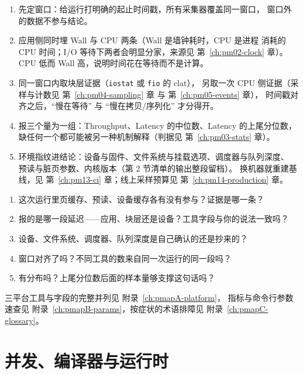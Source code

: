 \documentclass[12pt,a4paper,fontset=fandol]{ctexbook}
\newcommand{\Tp}[1]{\texttt{#1}}
\newcommand{\Lang}[1]{\textsf{#1}}
\newcommand{\MWall}{\Lang{Wall}}
\newcommand{\MCpu}{\Lang{CPU}}
\newcommand{\MLat}{\Lang{Latency}}
\newcommand{\MThr}{\Lang{Throughput}}
\newcommand{\Mx}[1]{\textsf{#1}}
\begin{document}
\begin{bestpractice}[title={把 I/O 的账与 CPU 的账分开测，但在同一次运行里对齐}]
\begin{enumerate}
\item 先定窗口：给运行打明确的起止时间戳，所有采集器覆盖同一窗口，
  窗口外的数据不参与结论。
\item 应用侧同时埋 \MWall{} 与 \MCpu{} 两条（\MWall{} 是墙钟耗时，\MCpu{} 是进程
  消耗的 CPU 时间；I/O 等待下两者会明显分家，来源见 第~\ref{ch:pm02-clock} 章）。
  \MCpu{} 低而 \MWall{} 高，说明时间花在等待而不是计算。
\item 同一窗口内取块层证据（\Tp{iostat} 或 \Tp{fio} 的 \Mx{clat}），
  另取一次 CPU 侧证据（采样与计数见 第~\ref{ch:pm04-sampling} 章 与 第~\ref{ch:pm05-events} 章），
  时间戳对齐之后，``慢在等待'' 与 ``慢在拷贝/序列化'' 才分得开。
\item 报三个量为一组：\MThr{}、\MLat{} 的中位数、\MLat{} 的上尾分位数，
  缺任何一个都可能被另一种机制解释（判据见 第~\ref{ch:pm03-stats} 章）。
\item 环境指纹进结论：设备与固件、文件系统与挂载选项、调度器与队列深度、
  预读与脏页参数、内核版本（第 2 节清单的输出整段留档）。
  换机器就重建基线，见 第~\ref{ch:pm13-ci} 章；线上采样预算见 第~\ref{ch:pm14-production} 章。
\end{enumerate}
\end{bestpractice}

\begin{guideline}[title={五问收口：一份 I/O 结论的最小体检}]
\begin{enumerate}
\item 这次运行里页缓存、预读、设备缓存各有没有参与？证据是哪一条？
\item 报的是哪一段延迟——应用、块层还是设备？工具字段与你的说法一致吗？
\item 设备、文件系统、调度器、队列深度是自己确认的还是抄来的？
\item 窗口对齐了吗？不同工具的数来自同一次运行的同一段吗？
\item 有分布吗？上尾分位数后面的样本量够支撑这句话吗？
\end{enumerate}
三平台工具与字段的完整并列见 附录~\ref{ch:pmapA-platform}，
指标与命令行参数速查见 附录~\ref{ch:pmapB-params}，按症状的术语排障见 附录~\ref{ch:pmapC-glossary}。
\end{guideline}
\part{并发、编译器与运行时}
\end{document}
